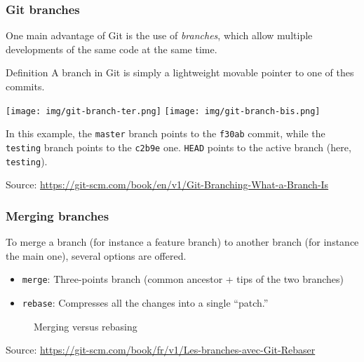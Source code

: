 \documentclass[svgnames]{beamer}
\begin{document}
\begin{frame}[fragile]
    \frametitle{Git branches}
    One main advantage of Git is the use of \emph{branches}, which allow multiple developments of the same code at the same time.

    \begin{block}{Definition}
        A branch in Git is simply a lightweight movable pointer to one of thes commits.
    \end{block}
    
    \begin{center}
        \texttt{[image: img/git-branch-ter.png]}
        \hspace{3em}
        \texttt{[image: img/git-branch-bis.png]}
    \end{center}

    In this example, the \verb+master+ branch points to the \verb+f30ab+ commit, while the \verb+testing+ branch points to the \verb+c2b9e+ one. \verb+HEAD+ points
    to the active branch (here, \verb+testing+).

    \vspace{1em}
    \tiny Source: \url{https://git-scm.com/book/en/v1/Git-Branching-What-a-Branch-Is}

\end{frame}

\begin{frame}[fragile]
    \frametitle{Merging branches}
    To merge a branch (for instance a feature branch) to another branch (for instance the main one), several options are offered.
    \begin{itemize}
        \item{\verb+merge+: Three-points branch (common ancestor + tips of the two branches)} 
        \item{\verb+rebase+: Compresses all the changes into a single “patch.” }
    \end{itemize}

    \begin{center}
        \begin{figure}
            \hspace{3em}
            \caption{Merging versus rebasing}
        \end{figure}
    \end{center}

    \tiny Source: \url{https://git-scm.com/book/fr/v1/Les-branches-avec-Git-Rebaser}

\end{frame}
\end{document}
